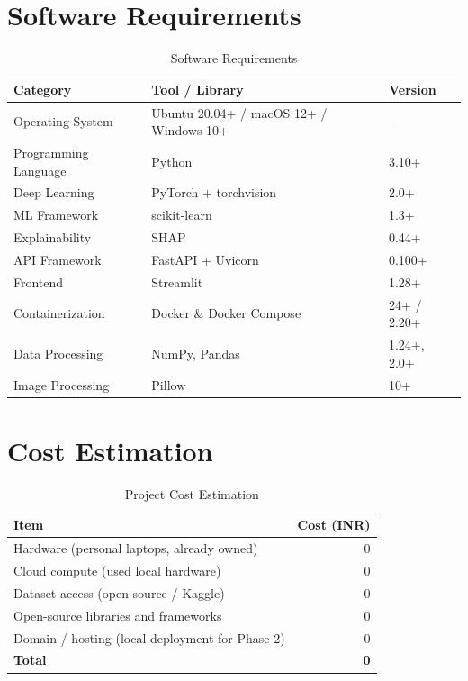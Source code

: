 \documentclass[12pt,a4paper]{report}
\begin{document}
\section{Software Requirements}
\begin{table}[h!]
\centering
\renewcommand{\arraystretch}{1.3}
\caption{Software Requirements}
\label{tab:sw_req}
\begin{tabular}{|L{4cm}|L{4.5cm}|L{3cm}|}
\hline
\textbf{Category} & \textbf{Tool / Library} & \textbf{Version} \\
\hline
Operating System & Ubuntu 20.04+ / macOS 12+ / Windows 10+ & -- \\
\hline
Programming Language & Python & 3.10+ \\
\hline
Deep Learning & PyTorch + torchvision & 2.0+ \\
\hline
ML Framework & scikit-learn & 1.3+ \\
\hline
Explainability & SHAP & 0.44+ \\
\hline
API Framework & FastAPI + Uvicorn & 0.100+ \\
\hline
Frontend & Streamlit & 1.28+ \\
\hline
Containerization & Docker \& Docker Compose & 24+ / 2.20+ \\
\hline
Data Processing & NumPy, Pandas & 1.24+, 2.0+ \\
\hline
Image Processing & Pillow & 10+ \\
\hline
\end{tabular}
\end{table}

\section{Cost Estimation}
\begin{table}[h!]
\centering
\renewcommand{\arraystretch}{1.3}
\caption{Project Cost Estimation}
\label{tab:cost}
\begin{tabular}{|L{9cm}|r|}
\hline
\textbf{Item} & \textbf{Cost (INR)} \\
\hline
Hardware (personal laptops, already owned) & 0 \\
\hline
Cloud compute (used local hardware) & 0 \\
\hline
Dataset access (open-source / Kaggle) & 0 \\
\hline
Open-source libraries and frameworks & 0 \\
\hline
Domain / hosting (local deployment for Phase 2) & 0 \\
\hline
\textbf{Total} & \textbf{0} \\
\hline
\end{tabular}
\end{table}
\end{document}

